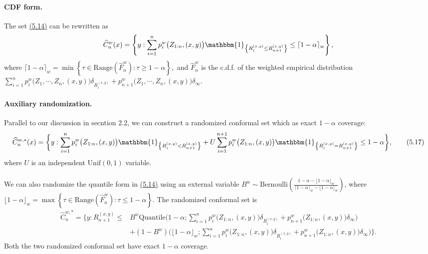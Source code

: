 \documentclass{article}
\numberwithin{equation}{section}
\begin{document}
\paragraph{CDF form.} The set \hyperref[5.14]{(5.14)} can be rewritten as
\begin{align*}
\widehat{C}_n^w(x) = \left\{y:\sum_{i=1}^np_i^w\bigl(Z_{1:n},(x,y)\bigr)\mathbbm{1}_{\left\{R_i^{(x,y)}\leq R_{n+1}^{(x,y)}\right\}}\leq\lceil 1-\alpha \rceil_w\right\},
\end{align*}
where $\lceil 1-\alpha\rceil_w = \min\left\{\tau\in\mathrm{Range}(\widehat{F}_n^w):\tau\geq 1-\alpha\right\},$ and $\widehat{F}_n^w$ is the c.d.f. of the weighted empirical distribution $\sum_{i=1}^np_i^w\bigl(Z_1,\cdots,Z_{n},(x,y)\bigr)\delta_{R_i^{(x,y)}} + p_{n+1}^w\bigl(Z_1,\cdots,Z_{n},(x,y)\bigr)\delta_\infty$.

\paragraph{Auxiliary randomization.} Parallel to our discussion in secntion 2.2, we can construct a randomized conformal set which as exact $1-\alpha$ coverage:
\begin{align*}
\widehat{C}_n^{w,*}(x) = \biggl\{y:\sum_{i=1}^np_i^w\bigl(Z_{1:n},(x,y)\bigr)\mathbbm{1}_{\left\{R_i^{(x,y)} < R_{n+1}^{(x,y)}\right\}} + U\sum_{i=1}^{n+1}p_i^w\bigl(Z_{1:n},(x,y)\bigr)\mathbbm{1}_{\left\{R_i^{(x,y)} = R_{n+1}^{(x,y)}\right\}}\leq 1-\alpha
\biggr\},\tag{5.17}
\end{align*}
where $U$ is an independent $\mathrm{Unif}(0,1)$ variable.

\paragraph{} We can also randomize the quantile form in \hyperref[5.14]{(5.14)} using an external variable $B^w\sim\mathrm{Bernoulli}\left(\frac{1-\alpha - \lfloor 1-\alpha\rfloor_w}{\lceil 1-\alpha\rceil_w - \lfloor 1-\alpha\rfloor_w}\right)$,
where $\lfloor 1-\alpha\rfloor_w = \max\left\{\tau\in\mathrm{Range}(\widehat{F}_n^w):\tau\leq 1-\alpha\right\}.$ The randomized conformal set is
\begin{align*}
	\widehat{C}_n^{w,*} = \biggl\{y: R_{n+1}^{(x,y)} \leq &B^w \mathrm{Quantile}\biggl(1-\alpha;\sum_{i=1}^np_i^w\bigl(Z_{1:n},(x,y)\bigr)\delta_{R_i^{(x,y)}} + p_{n+1}^w\bigl(Z_{1:n},(x,y)\bigr)\delta_\infty\biggr)\\
	&+ (1-B^w)\biggl(\lfloor 1-\alpha\rfloor_w;\sum_{i=1}^np_i^w\bigl(Z_{1:n},(x,y)\bigr)\delta_{R_i^{(x,y)}} + p_{n+1}^w\bigl(Z_{1:n},(x,y)\bigr)\delta_\infty\biggr)
	\biggl\}.\tag{5.18}
\end{align*}
Both the two randomized conformal set have exact $1-\alpha$ coverage.
\end{document}
